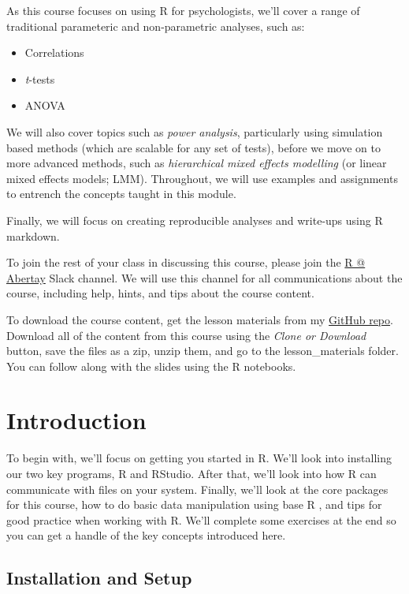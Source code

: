 \documentclass[
]{book}
\providecommand{\tightlist}{%
  \setlength{\itemsep}{0pt}\setlength{\parskip}{0pt}}
\begin{document}
As this course focuses on using R for psychologists, we'll cover a range of traditional parameteric and non-parametric analyses, such as:

\begin{itemize}
\tightlist
\item
  Correlations
\item
  \emph{t}-tests
\item
  ANOVA
\end{itemize}

We will also cover topics such as \emph{power analysis}, particularly using simulation based methods (which are scalable for any set of tests), before we move on to more advanced methods, such as \emph{hierarchical mixed effects modelling} (or linear mixed effects models; LMM). Throughout, we will use examples and assignments to entrench the concepts taught in this module.

Finally, we will focus on creating reproducible analyses and write-ups using R markdown.

To join the rest of your class in discussing this course, please join the \href{https://rabertay.slack.com/}{R @ Abertay} Slack channel. We will use this channel for all communications about the course, including help, hints, and tips about the course content.

To download the course content, get the lesson materials from my \href{https://github.com/gpwilliams/r4psych/tree/master/}{GitHub repo}. Download all of the content from this course using the \emph{Clone or Download} button, save the files as a zip, unzip them, and go to the lesson\_materials folder. You can follow along with the slides using the R notebooks.

\hypertarget{introduction}{%
\chapter{Introduction}\label{introduction}}

To begin with, we'll focus on getting you started in R. We'll look into installing our two key programs, R and RStudio. After that, we'll look into how R can communicate with files on your system. Finally, we'll look at the core packages for this course, how to do basic data manipulation using base R \citep{R-base}, and tips for good practice when working with R. We'll complete some exercises at the end so you can get a handle of the key concepts introduced here.

\hypertarget{installation-and-setup}{%
\section{Installation and Setup}\label{installation-and-setup}}
\end{document}
